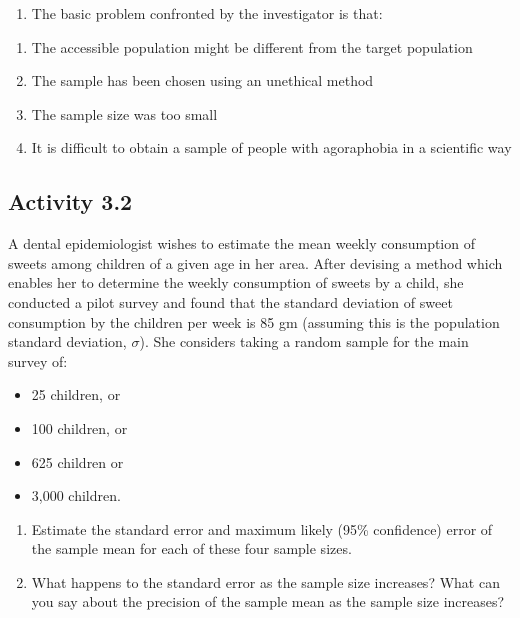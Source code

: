\documentclass[
]{memoir}
\providecommand{\tightlist}{%
  \setlength{\itemsep}{0pt}\setlength{\parskip}{0pt}}
\begin{document}
\begin{enumerate}
\def\labelenumi{\arabic{enumi}.}
\setcounter{enumi}{1}
\tightlist
\item
  The basic problem confronted by the investigator is that:
\end{enumerate}

\begin{enumerate}
\def\labelenumi{\alph{enumi})}
\tightlist
\item
  The accessible population might be different from the target population
\item
  The sample has been chosen using an unethical method
\item
  The sample size was too small
\item
  It is difficult to obtain a sample of people with agoraphobia in a scientific way
\end{enumerate}

\hypertarget{activity-3.2}{%
\subsection*{Activity 3.2}\label{activity-3.2}}

A dental epidemiologist wishes to estimate the mean weekly consumption of sweets among children of a given age in her area. After devising a method which enables her to determine the weekly consumption of sweets by a child, she conducted a pilot survey and found that the standard deviation of sweet consumption by the children per week is 85 gm (assuming this is the population standard deviation, \(\sigma\)). She considers taking a random sample for the main survey of:

\begin{itemize}
\tightlist
\item
  25 children, or
\item
  100 children, or
\item
  625 children or
\item
  3,000 children.
\end{itemize}

\begin{enumerate}
\def\labelenumi{\alph{enumi})}
\tightlist
\item
  Estimate the standard error and maximum likely (95\% confidence) error of the sample mean for each of these four sample sizes.
\item
  What happens to the standard error as the sample size increases? What can you say about the precision of the sample mean as the sample size increases?
\end{enumerate}
\end{document}

